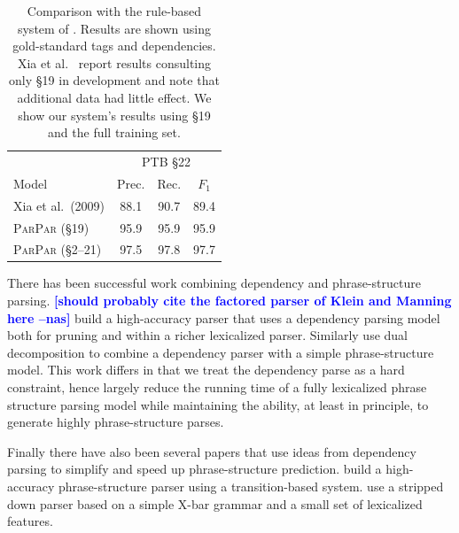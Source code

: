 \documentclass[11pt,letterpaper]{article}
\newcommand{\ParseName}{\textsc{ParPar}}
\newcommand{\nascomment}[1]{\textcolor{blue}{\bf \small [#1 --nas]}}
\begin{document}
\begin{table}
  \centering
  \begin{tabular}{|l|ccc|}

    \hline
    & \multicolumn{3}{|c|}{PTB \S 22} \\
    Model & Prec. & Rec. & $F_1$  \\
    \hline

    \hline
    Xia et al.~(2009)    & 88.1 & 90.7 & 89.4 \\
    \ParseName{} (\S 19)  & 95.9 & 95.9 & 95.9    \\
    \ParseName{}  (\S 2--21) & 97.5 & 97.8 & 97.7    \\
    \hline

  \end{tabular}
  \caption{Comparison with the rule-based system of .
    Results are shown using gold-standard tags and
    dependencies.  Xia et al.~
 report results consulting only \S 19 in development and
note that additional data had little effect.  We show our system's
results using \S 19 and the full training set. 
  \label{tab:convert}}
\end{table}



There has been successful work combining dependency and
phrase-structure parsing. 
\nascomment{should probably cite the factored parser of Klein and
  Manning here}
 build a
high-accuracy parser that uses a dependency parsing model both for
pruning and within a richer lexicalized parser. Similarly
 use dual decomposition to combine a dependency
parser with a simple phrase-structure model. This work differs
in that we treat the dependency parse as a hard constraint, hence largely reduce the
running time of a fully lexicalized phrase structure parsing model
while maintaining the ability, at least in principle,
to generate highly phrase-structure parses. 




Finally there have also been several papers that use ideas from
dependency parsing to simplify and speed up phrase-structure prediction.
 build a high-accuracy phrase-structure parser
using a transition-based system.  use a stripped
down parser based on a simple X-bar grammar and a small set of lexicalized features.
\end{document}
